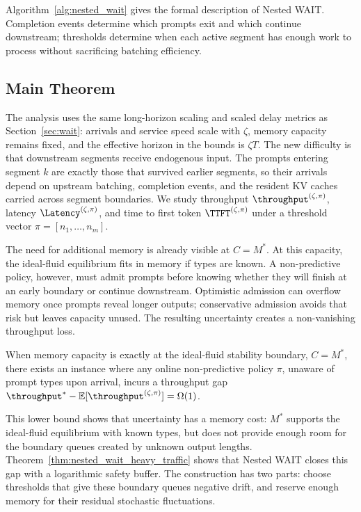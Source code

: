 Algorithm~\ref{alg:nested_wait} gives the formal description of Nested WAIT. Completion events determine which prompts exit and which continue downstream; thresholds determine when each active segment has enough work to process without sacrificing batching efficiency.

\subsection{Main Theorem}
\label{subsec:nested_main_theorem}

The analysis uses the same long-horizon scaling and scaled delay metrics as Section~\ref{sec:wait}: arrivals and service speed scale with \(\zeta\), memory capacity remains fixed, and the effective horizon in the bounds is \(\zeta T\). The new difficulty is that downstream segments receive endogenous input. The prompts entering segment \(k\) are exactly those that survived earlier segments, so their arrivals depend on upstream batching, completion events, and the resident KV caches carried across segment boundaries. We study throughput \(\throughput^{(\zeta,\pi)}\), latency \(\Latency^{(\zeta,\pi)}\), and time to first token \(\TTFT^{(\zeta,\pi)}\) under a threshold vector \(\pi=[n_1,\dots,n_m]\).

The need for additional memory is already visible at \(C=M^*\). At this capacity, the ideal-fluid equilibrium fits in memory if types are known. A non-predictive policy, however, must admit prompts before knowing whether they will finish at an early boundary or continue downstream. Optimistic admission can overflow memory once prompts reveal longer outputs; conservative admission avoids that risk but leaves capacity unused. The resulting uncertainty creates a non-vanishing throughput loss.

\begin{proposition}
\label{prop:unknown_lower_bound}
When memory capacity is exactly at the ideal-fluid stability boundary, \(C=M^*\), there exists an instance where any online non-predictive policy \( \pi \), unaware of prompt types upon arrival, incurs a throughput gap \( \throughput^* - \mathbb{E}[\throughput^{(\zeta, \pi)}] = \Omega(1) \).
\end{proposition}

This lower bound shows that uncertainty has a memory cost: \(M^*\) supports the ideal-fluid equilibrium with known types, but does not provide enough room for the boundary queues created by unknown output lengths. Theorem~\ref{thm:nested_wait_heavy_traffic} shows that Nested WAIT closes this gap with a logarithmic safety buffer. The construction has two parts: choose thresholds that give these boundary queues negative drift, and reserve enough memory for their residual stochastic fluctuations.

